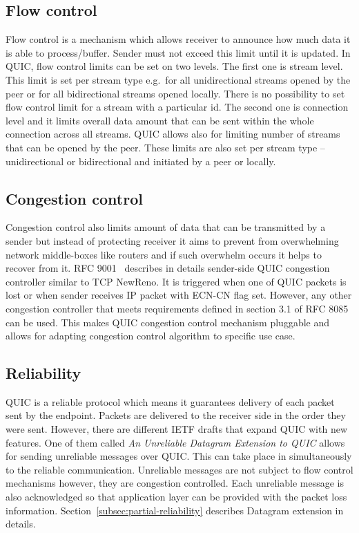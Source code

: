 \subsection{Flow control}
\label{subsec:flow-control-and-congestion-control}
Flow control is a mechanism which allows receiver to announce how much data it is able to process/buffer.
Sender must not exceed this limit until it is updated.
In QUIC, flow control limits can be set on two levels.
The first one is stream level.
This limit is set per stream type e.g.\ for all unidirectional streams opened by the peer or for all bidirectional streams opened locally.
There is no possibility to set flow control limit for a stream with a particular id.
The second one is connection level and it limits overall data amount that can be sent within the whole connection across all streams.
QUIC allows also for limiting number of streams that can be opened by the peer.
These limits are also set per stream type -- unidirectional or bidirectional and initiated by a peer or locally.

\subsection{Congestion control}
\label{subsec:congestion-control}
Congestion control also limits amount of data that can be transmitted by a sender but instead of protecting receiver it aims to prevent from overwhelming network middle-boxes like routers and if such overwhelm occurs it helps to recover from it.
RFC 9001~\cite{rfc9001} describes in details sender-side QUIC congestion controller similar to TCP NewReno.
It is triggered when one of QUIC packets is lost or when sender receives IP packet with ECN-CN flag set.
However, any other congestion controller that meets requirements defined in section 3.1 of RFC 8085~\cite{rfc8085} can be used.
This makes QUIC congestion control mechanism pluggable and allows for adapting congestion control algorithm to specific use case.

\subsection{Reliability}
\label{subsec:reliability}
QUIC is a reliable protocol which means it guarantees delivery of each packet sent by the endpoint.
Packets are delivered to the receiver side in the order they were sent.
However, there are different IETF drafts that expand QUIC with new features.
One of them called \textit{An Unreliable Datagram Extension to QUIC}\cite{bider-ssh-quic-09} allows for sending unreliable messages over QUIC\@.
This can take place in simultaneously to the reliable communication.
Unreliable messages are not subject to flow control mechanisms however, they are congestion controlled.
Each unreliable message is also acknowledged so that application layer can be provided with the packet loss information.
Section~\ref{subsec:partial-reliability} describes Datagram extension in details.

